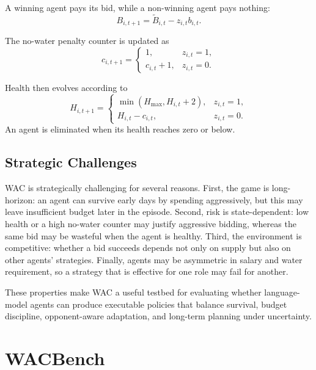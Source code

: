 \documentclass[letterpaper]{article} %
\begin{document}
A winning agent pays its bid, while a non-winning agent pays
nothing:
\begin{equation}
    B_{i,t+1}
    =
    \widetilde{B}_{i,t}-z_{i,t}b_{i,t}.
\end{equation}

The no-water penalty counter is updated as
\begin{equation}
    c_{i,t+1}
    =
    \begin{cases}
        1, & z_{i,t}=1,\\
        c_{i,t}+1, & z_{i,t}=0.
    \end{cases}
\end{equation}

Health then evolves according to
\begin{equation}
    H_{i,t+1}
    =
    \begin{cases}
        \min(H_{\max},H_{i,t}+2), & z_{i,t}=1,\\
        H_{i,t}-c_{i,t}, & z_{i,t}=0.
    \end{cases}
\end{equation}
An agent is eliminated when its health reaches zero or below.

\subsection{Strategic Challenges}

WAC is strategically challenging for several reasons. First, the game is long-horizon: an agent can survive early days by spending aggressively, but this may leave insufficient budget later in the episode. Second, risk is state-dependent: low health or a high no-water counter may justify aggressive bidding, whereas the same bid may be wasteful when the agent is healthy. Third, the environment is competitive: whether a bid succeeds depends not only on supply but also on other agents' strategies. Finally, agents may be asymmetric in salary and water requirement, so a strategy that is effective for one role may fail for another.

These properties make WAC a useful testbed for evaluating whether language-model agents can produce executable policies that balance survival, budget discipline, opponent-aware adaptation, and long-term planning under uncertainty.

\section{WACBench}
\end{document}
